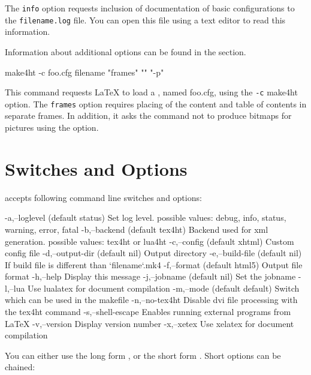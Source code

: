 The \texttt{info} option requests inclusion of documentation of basic configurations to the \texttt{filename.log} file.
You can open this file using a text editor to read this information.

Information about additional options can be found in the  section.



\begin{shellcommand}
make4ht -c foo.cfg filename "frames" "" "-p"
\end{shellcommand}

This command requests LaTeX to load a , named
foo.cfg, using the \texttt{-c} make4ht option. The \texttt{frames} option
requires placing of the content and table of contents in separate frames. In
addition, it asks the  command not to produce bitmaps for pictures using the  option.

\section{\makefourht{} Switches and Options}

\makefourht{} accepts following command line switches and options:

\begin{textsource}
-a,--loglevel (default status) Set log level.
possible values: debug, info, status, warning, error, fatal
-b,--backend (default tex4ht) Backend used for xml generation. 
possible values: tex4ht or lua4ht
-c,--config (default xhtml) Custom config file
-d,--output-dir (default nil)  Output directory
-e,--build-file (default nil)  If build file is different than `filename`.mk4
-f,--format  (default html5)  Output file format
-h,--help  Display this message
-j,--jobname (default nil)  Set the jobname
-l,--lua  Use lualatex for document compilation
-m,--mode (default default) Switch which can be used in the makefile 
-n,--no-tex4ht Disable dvi file processing with the tex4ht command
-s,--shell-escape Enables running external programs from LaTeX
-v,--version  Display version number
-x,--xetex Use xelatex for document compilation
\end{textsource}

You can either use the long form , or the short form . 
Short options can be chained:


